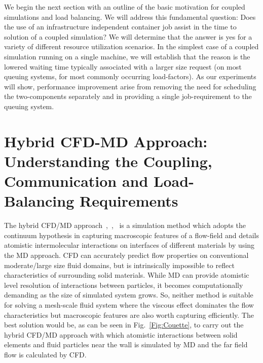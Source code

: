 \documentclass[conference,final]{IEEEtran}
\newcommand{\jhanote}[1]{ {\textcolor{red} { ***Jha: #1 }}}
\newcommand{\skonote}[1]{ {\textcolor{blue} { ***Jeff: #1 }}}
\newcommand{\jhanote}[1]{}
\newcommand{\skonote}[1]{}
\begin{document}
We begin the next section with an outline of the basic motivation for
coupled simulations and load balancing.  We will address this
fundamental question: Does the use of an infrastructure independent
container job assist in the time to solution of a coupled simulation? We
will determine that the answer is yes for a variety of different
resource utilization scenarios. In the simplest case of a coupled
simulation running on a single machine, we will establish that the
reason is the lowered waiting time typically associated with a larger
size request (on most queuing systems, for most commonly occurring load-factors).  As our experiments will show, performance improvement arise
from removing the need for scheduling the two-components separately
and in providing a single job-requirement to the queuing system.


\section{Hybrid CFD-MD Approach: Understanding the Coupling,
  Communication and Load-Balancing Requirements}


The hybrid CFD/MD approach~\cite{Thompson},~\cite{Nie},~\cite{Yen} is
a simulation method which adopts the continuum hypothesis in capturing
macroscopic features of a flow-field and details atomistic
intermolecular interactions on interfaces of different materials by
using the MD approach. CFD can accurately predict flow properties on
conventional moderate/large size fluid domains, but is intrinsically
impossible to reflect characteristics of surrounding solid materials.
While MD can provide atomistic level resolution of interactions
between particles, it becomes computationally demanding as the size of simulated system grows. So, neither method is suitable for solving a mesh-scale fluid system where the viscous effect dominates the flow characteristics but macroscopic features are also worth capturing efficiently. The best solution would be, as can be seen in Fig.~\ref{Fig:Couette}, to
carry out the hybrid CFD/MD approach with which atomistic
interactions between solid elements and fluid particles near the wall
is simulated by MD and the far field flow is calculated by CFD.


\end{document}
